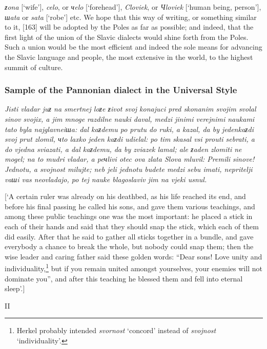 \textit{ƶona} [‘wife’], \textit{celo}, or \textit{чelo} [‘forehead’], \textit{Cloviek}, or \textit{Чloviek} [‘human being, person’], \textit{шata} or \textit{sata} [‘robe’] etc. We hope that this way of writing, or something similar to it, [163] will be adopted by the Poles as far as possible; and indeed, that the first light of the union of the Slavic dialects would shine forth from the Poles. Such a union would be the most efficient and indeed the sole means for advancing the Slavic language and people, the most extensive in the world, to the highest summit of culture.

\subsubsection*{Sample of the Pannonian dialect in the Universal Style}

\textit{Jisti vladar juƶ na smertnej loƶe ƶivot svoj konajuci pred skonanim svojim svolal sinov svojix, a jim mnoge razdilne nauki daval, medzi jinimi verejnimi naukami tato byla najglavneiшa: dal kaƶdemu po prutu do ruki, a kazal, da by jedenkaƶdi svoj prut zlomil, чto laxko jeden kaƶdi udielal: po tim skasal vsi prouti sebrati, a do vjedna sviazati, a dal kaƶdemu, da by zviazek lamal; ale ƶaden zlomiti ne mogel; na to mudri vladar, a peчlivi otec ova zlata Slova mluvil: Premili sinove! Jednotu, a svojnost milujte; neb jeli jednotu budete medzi sebu imati, nepritelji vaшi vas neovladajo, po tej nauke blagoslaviv jim na vjeki usnul.}

[‘A certain ruler was already on his deathbed, as his life reached its end, and before his final passing he called his sons, and gave them various teachings, and among these public teachings one was the most important: he placed a stick in each of their hands and said that they should snap the stick, which each of them did easily. After that he said to gather all sticks together in a bundle, and gave everybody a chance to break the whole, but nobody could snap them; then the wise leader and caring father said these golden words: “Dear sons! Love unity and individuality,\footnote{Herkel probably intended \textit{svornost} ‘concord’ instead of \textit{svojnost} ‘individuality’.} but if you remain united amongst yourselves, your enemies will not dominate you”, and after this teaching he blessed them and fell into eternal sleep’.]

\begin{center}
    II
\end{center}

